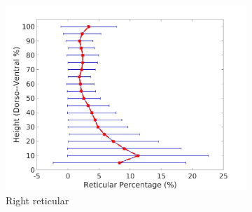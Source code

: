\begin{figure}[H]
\begin{subfigure}{.42\linewidth}
  \includegraphics[width=\linewidth,trim={{.0\wd0} {.0\wd0} {.0\wd0} {.0\wd0}},clip]{QuantitativeAnalysis/Image/RightLungReticularDiseaseDorsoToVentral.jpg}
  \caption{Right reticular}
  \label{fig:DiseaseDorsoToVentral-d}
\end{subfigure}
\begin{subfigure}{.42\linewidth}%

\end{subfigure}
\end{figure}
